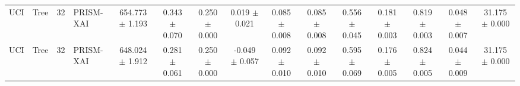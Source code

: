 \begin{table}[t]
\begin{tabular}{llllccccccccccc}
UCI & Tree & 32 & PRISM-XAI & 654.773 $\pm$ 1.193 & 0.343 $\pm$ 0.070 & 0.250 $\pm$ 0.000 & 0.019 $\pm$ 0.021 & 0.085 $\pm$ 0.008 & 0.085 $\pm$ 0.008 & 0.556 $\pm$ 0.045 & 0.181 $\pm$ 0.003 & 0.819 $\pm$ 0.003 & 0.048 $\pm$ 0.007 & 31.175 $\pm$ 0.000 \\
UCI & Tree & 32 & PRISM-XAI & 648.024 $\pm$ 1.912 & 0.281 $\pm$ 0.061 & 0.250 $\pm$ 0.000 & -0.049 $\pm$ 0.057 & 0.092 $\pm$ 0.010 & 0.092 $\pm$ 0.010 & 0.595 $\pm$ 0.069 & 0.176 $\pm$ 0.005 & 0.824 $\pm$ 0.005 & 0.044 $\pm$ 0.009 & 31.175 $\pm$ 0.000 \\
\bottomrule
\end{tabular}
\end{table}
